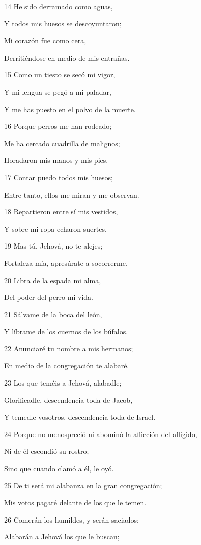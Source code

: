 \par 14 He sido derramado como aguas,
\par Y todos mis huesos se descoyuntaron;
\par Mi corazón fue como cera,
\par Derritiéndose en medio de mis entrañas.
\par 15 Como un tiesto se secó mi vigor,
\par Y mi lengua se pegó a mi paladar,
\par Y me has puesto en el polvo de la muerte.
\par 16 Porque perros me han rodeado;
\par Me ha cercado cuadrilla de malignos;
\par Horadaron mis manos y mis pies.
\par 17 Contar puedo todos mis huesos;
\par Entre tanto, ellos me miran y me observan.
\par 18 Repartieron entre sí mis vestidos,
\par Y sobre mi ropa echaron suertes.
\par 19 Mas tú, Jehová, no te alejes;
\par Fortaleza mía, apresúrate a socorrerme.
\par 20 Libra de la espada mi alma,
\par Del poder del perro mi vida.
\par 21 Sálvame de la boca del león,
\par Y líbrame de los cuernos de los búfalos.
\par 22 Anunciaré tu nombre a mis hermanos;
\par En medio de la congregación te alabaré.
\par 23 Los que teméis a Jehová, alabadle;
\par Glorificadle, descendencia toda de Jacob,
\par Y temedle vosotros, descendencia toda de Israel.
\par 24 Porque no menospreció ni abominó la aflicción del afligido,
\par Ni de él escondió su rostro;
\par Sino que cuando clamó a él, le oyó.
\par 25 De ti será mi alabanza en la gran congregación;
\par Mis votos pagaré delante de los que le temen.
\par 26 Comerán los humildes, y serán saciados;
\par Alabarán a Jehová los que le buscan;
